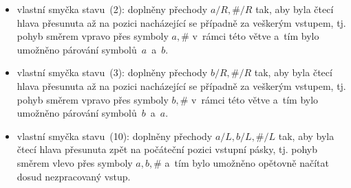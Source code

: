 \documentclass[a4paper, 11pt]{article}
\begin{document}
\begin{itemize}
    \item vlastní smyčka stavu~(2): doplněny přechody $a / R, \# / R$ tak, aby byla čtecí hlava přesunuta až na pozici nacházející se případně za veškerým vstupem, tj. pohyb směrem vpravo přes symboly $a, \#$ v~rámci této větve a~tím bylo umožněno párování symbolů~$a$~a~$b$.
    \item vlastní smyčka stavu~(3): doplněny přechody $b / R, \# / R$ tak, aby byla čtecí hlava přesunuta až na pozici nacházející se případně za veškerým vstupem, tj. pohyb směrem vpravo přes symboly $b, \#$ v~rámci této větve a~tím bylo umožněno párování symbolů~$b$~a~$a$.
    \item vlastní smyčka stavu~(10): doplněny přechody $a / L, b / L, \# / L$ tak, aby byla čtecí hlava přesunuta zpět na počáteční pozici vstupní pásky, tj. pohyb směrem vlevo přes symboly $a, b, \#$ a~tím bylo umožněno opětovně načítat dosud nezpracovaný vstup.
\end{itemize}
\end{document}

